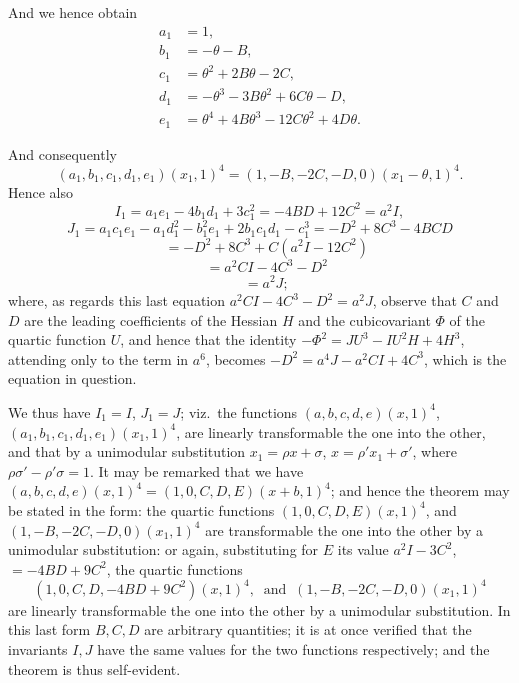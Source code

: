 \documentclass[11pt,a4paper]{article}
\begin{document}
And we hence obtain
\[
\begin{aligned}
a_{1} &= 1,\\
b_{1} &= -\theta - B,\\
c_{1} &= \theta^{2} + 2B\theta - 2C,\\
d_{1} &= -\theta^{3} - 3B\theta^{2} + 6C\theta - D,\\
e_{1} &= \theta^{4} + 4B\theta^{3} - 12C\theta^{2} + 4D\theta.
\end{aligned}
\]

\newpage


And consequently
\[
(a_{1}, b_{1}, c_{1}, d_{1}, e_{1})(x_{1}, 1)^{4} = (1, -B, -2C, -D, 0)(x_{1} - \theta, 1)^{4}.
\]
Hence also
\[
I_{1} = a_{1}e_{1} - 4b_{1}d_{1} + 3c_{1}^{2} = -4BD + 12C^{2} = a^{2}I,
\]
\[
J_{1} = a_{1}c_{1}e_{1} - a_{1}d_{1}^{2} - b_{1}^{2}e_{1} + 2b_{1}c_{1}d_{1} - c_{1}^{3} = -D^{2} + 8C^{3} - 4BCD
\]
\[
\phantom{J_{1}} = -D^{2} + 8C^{3} + C(a^{2}I - 12C^{2})
\]
\[
\phantom{J_{1}} = a^{2}CI - 4C^{3} - D^{2}
\]
\[
\phantom{J_{1}} = a^{2}J;
\]
where, as regards this last equation $a^{2}CI - 4C^{3} - D^{2} = a^{2}J$, observe that $C$ and $D$ are the leading coefficients of the Hessian $H$ and the cubicovariant $\Phi$ of the quartic function $U$, and hence that the identity $-\Phi^{2} = JU^{3} - IU^{2}H + 4H^{3}$, attending only to the term in $a^{6}$, becomes $-D^{2} = a^{4}J - a^{2}CI + 4C^{3}$, which is the equation in question.

We thus have $I_{1} = I$, $J_{1} = J$; viz.\ the functions $(a, b, c, d, e)(x, 1)^{4}$, $(a_{1}, b_{1}, c_{1}, d_{1}, e_{1})(x_{1}, 1)^{4}$, are linearly transformable the one into the other, and that by a unimodular substitution $x_{1} = \rho x + \sigma$, $x = \rho'x_{1} + \sigma'$, where $\rho\sigma' - \rho'\sigma = 1$. It may be remarked that we have $(a, b, c, d, e)(x, 1)^{4} = (1, 0, C, D, E)(x + b, 1)^{4}$; and hence the theorem may be stated in the form: the quartic functions $(1, 0, C, D, E)(x, 1)^{4}$, and $(1, -B, -2C, -D, 0)(x_{1}, 1)^{4}$ are transformable the one into the other by a unimodular substitution: or again, substituting for $E$ its value $a^{2}I - 3C^{2}$, $= -4BD + 9C^{2}$, the quartic functions
\[
(1, 0, C, D, -4BD + 9C^{2})(x, 1)^{4}, \;\;\text{and}\;\; (1, -B, -2C, -D, 0)(x_{1}, 1)^{4}
\]
are linearly transformable the one into the other by a unimodular substitution. In this last form $B, C, D$ are arbitrary quantities; it is at once verified that the invariants $I, J$ have the same values for the two functions respectively; and the theorem is thus self-evident.
\end{document}
